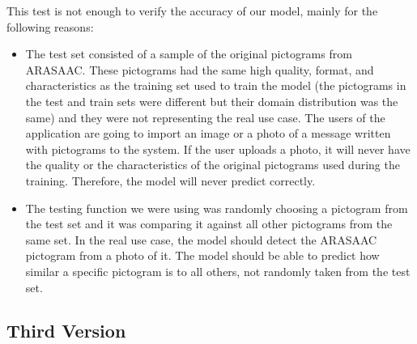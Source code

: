 \begin{table}[!ht]
\begin{center}
\end{center}
\caption{Results from the second version of the pictogram identification algorithm.}
\label{table:trainingv2}
\end{table}

This test is not enough to verify the accuracy of our model, mainly for the following reasons:

\begin{itemize}
\item The test set consisted of a sample of the original pictograms from ARASAAC. These pictograms had the same high quality, format, and characteristics as the training set used to train the model (the pictograms in the test and train sets were different but their domain distribution was the same) and they were not representing the real use case. The users of the application are going to import an image or a photo of a message written with pictograms to the system. If the user uploads a photo, it will never have the quality or the characteristics of the original pictograms used during the training. Therefore, the model will never predict correctly.

\item The testing function we were using was randomly choosing a pictogram from the test set and it was comparing it against all other pictograms from the same set. In the real use case, the model should detect the ARASAAC pictogram from a photo of it. The model should be able to predict how similar a specific pictogram is to all others, not randomly taken from the test set. 
\end{itemize}

\subsection{Third Version}
\label{Third Iteration of the One-shot model}


